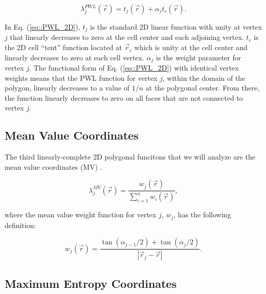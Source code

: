 \documentclass[preprint,10pt]{elsarticle}
\begin{document}
\begin{equation}
\label{eq::PWL_2D}
\lambda_j^{PWL} (\vec{r}) = t_j (\vec{r}) + \alpha_j t_c (\vec{r}) .
\end{equation}

\noindent In Eq. (\ref{eq::PWL_2D}), $t_j$ is the standard 2D linear function with unity at vertex $j$ that linearly decreases to zero at the cell center and each adjoining vertex. $t_c$ is the 2D cell ``tent'' function located at $\vec{r}_{c}$ which is unity at the cell center and linearly decreases to zero at each cell vertex. $\alpha_{j}$ is the weight parameter for vertex $j$. The functional form of Eq. (\ref{eq::PWL_2D}) with identical vertex weights means that the PWL function for vertex $j$, within the domain of the polygon, linearly decreases to a value of $1/n$ at the polygonal center. From there, the function linearly decreases to zero on all faces that are not connected to vertex $j$.

\subsection{Mean Value Coordinates}

The third linearly-complete 2D polygonal funcitons that we will analyze are the mean value coordinates (MV) \cite{floater2003mean}.

\begin{equation}
\label{eq::MV_BF}
\lambda_{j}^{MV} (\vec{r}) = \frac{w_j (\vec{r}) }{\sum\limits_{i=1}^{n} w_i (\vec{r})} ,
\end{equation}

\noindent where the mean value weight function for vertex $j$, $w_j$, has the following definition:

\begin{equation}
\label{eq::MV_weights}
w_j (\vec{r})  = \frac{\tan(\alpha_{j-1} / 2) + \tan(\alpha_j / 2)}{|\vec{r}_j - \vec{r}|}.
\end{equation}

\subsection{Maximum Entropy Coordinates}
\end{document}
